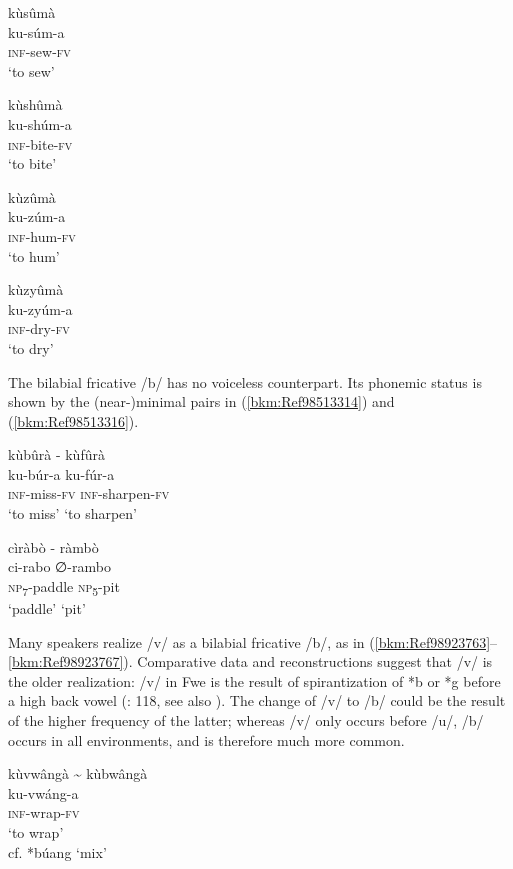 \ex
\glll kùsûmà\\
ku-súm-a\\
\textsc{inf}-sew-\textsc{fv}\\
\glt ‘to sew’

\ex
\glll kùshûmà\\
ku-shúm-a\\
\textsc{inf}-bite-\textsc{fv}\\
\glt ‘to bite’  

\ex
\glll kùzûmà\\
ku-zúm-a\\
\textsc{inf}-hum-\textsc{fv}\\
\glt ‘to hum’

\ex
\glll kùzyûmà\\
ku-zyúm-a\\
\textsc{inf}-dry-\textsc{fv}\\
\glt ‘to dry’
\z
\z

The bilabial fricative /b/ has no voiceless counterpart. Its phonemic status is shown by the (near-)minimal pairs in (\ref{bkm:Ref98513314}) and (\ref{bkm:Ref98513316}).

\ea
\label{bkm:Ref98513314}
kùbûrà \tab    - \tab  kùfûrà\\
ku-búr-a \tab \tab     ku-fúr-a\\
\textsc{inf}-miss-\textsc{fv}  \tab\tab    \textsc{inf}-sharpen-\textsc{fv}\\
‘to miss’ \tab\tab     ‘to sharpen’
\z

\ea
\label{bkm:Ref98513316}
cìràbò \tab     - \tab ràmbò\\
ci-rabo   \tab\tab   ∅-rambo\\
\textsc{np}\textsubscript{7}-paddle  \tab\tab    \textsc{np}\textsubscript{5}-pit\\
‘paddle’ \tab\tab      ‘pit’
\z

Many speakers realize /v/ as a bilabial fricative /b/, as in (\ref{bkm:Ref98923763}--\ref{bkm:Ref98923767}). Comparative data and reconstructions suggest that /v/ is the older realization: /v/ in Fwe is the result of spirantization of *b or *g before a high back vowel (\citealt{Bostoen2009}: 118, see also ). The change of /v/ to /b/ could be the result of the higher fre\-quency of the latter; whereas /v/ only occurs before /u/, /b/ occurs in all environments, and is therefore much more common.

\ea
\label{bkm:Ref98923763}
kùvwângà {\textasciitilde} kùbwângà\\
\gll ku-vwáng-a\\
\textsc{inf}-wrap-\textsc{fv}\\
\glt ‘to wrap’\\
cf. *búang ‘mix’ \citep{BastinEtAl2002}\\
\z

